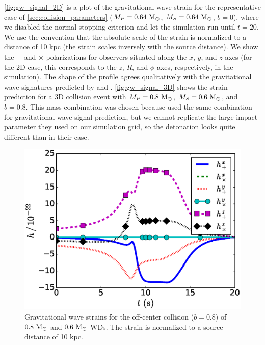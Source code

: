 \documentclass[12pt]{article}
\begin{document}
\autoref{fig:gw_signal_2D} is a plot of the gravitational wave strain for
the representative case of \autoref{sec:collision_parameters} ($M_P = 0.64\ \mathrm{M}_\odot$, $M_S = 0.64\ \mathrm{M}_\odot$, $b = 0$),
where we disabled the normal stopping criterion and let the simulation run until $t = 20$.
We use the convention that the absolute scale of the strain is normalized to a distance
of 10 kpc (the strain scales inversely with the source distance). We show the $+$ and $\times$
polarizations for observers situated along the $x$, $y$, and $z$ axes (for the 2D case,
this corresponds to the $z$, $R$, and $\phi$ axes, respectively, in the simulation).
The shape of the profile agrees qualitatively with the gravitational wave signatures
predicted by \cite{loren-aguilar:2009:collisions} and \cite{garcia-senz:2013}.
\autoref{fig:gw_signal_3D} shows the strain prediction for a 3D collision event
with $M_P = 0.8\ \mathrm{M}_\odot$, $M_S = 0.6\ \mathrm{M}_\odot$, and $b = 0.8$. This mass combination
was chosen because \cite{loren-aguilar:2009:collisions} used the same combination for
gravitational wave signal prediction, but we cannot replicate the large impact parameter
they used on our simulation grid, so the detonation looks quite different than in their case.

\begin{figure}
  \centering
  \includegraphics[scale=0.8]{plots/gw_signal_3D}
  \caption[Gravitational wave strain, off-center collision]
          {Gravitational wave strains for the off-center collision ($b = 0.8$) of
           $0.8\ \mathrm{M}_\odot$ and $0.6\ \mathrm{M}_\odot$ WDs. The strain is normalized to a
           source distance of 10 kpc.
           \label{fig:gw_signal_3D}}
\end{figure}
\end{document}
